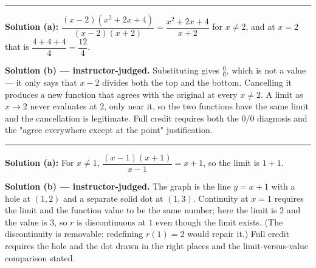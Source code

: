 \documentclass[12pt]{article}
\begin{document}
\vspace{0.15cm}\noindent\rule{\linewidth}{0.2pt}\vspace{0.15cm}


\textbf{Solution (a):} \quad
$\dfrac{(x-2)\left(x^2+2x+4\right)}{(x-2)(x+2)} = \dfrac{x^2+2x+4}{x+2}$ for $x \ne 2$, and at
$x = 2$ that is $\dfrac{4+4+4}{4} = \dfrac{12}{4}$. 

\textbf{Solution (b) --- instructor-judged.} \quad Substituting gives $\frac{0}{0}$, which is
not a value --- it only says that $x-2$ divides both the top and the bottom. Cancelling it
produces a new function that agrees with the original at every $x \ne 2$. A limit as
$x \to 2$ never evaluates at $2$, only near it, so the two functions have the same limit and
the cancellation is legitimate. Full credit requires both the $0/0$ diagnosis and the
"agree everywhere except at the point" justification.

\vspace{0.15cm}\noindent\rule{\linewidth}{0.2pt}\vspace{0.15cm}


\textbf{Solution (a):} \quad For $x \ne 1$, $\dfrac{(x-1)(x+1)}{x-1} = x+1$, so the limit is
$1 + 1$. 

\textbf{Solution (b) --- instructor-judged.} \quad The graph is the line $y = x + 1$ with a hole
at $(1,2)$ and a separate solid dot at $(1,3)$. Continuity at $x = 1$ requires the limit and the
function value to be the same number; here the limit is $2$ and the value is $3$, so $r$ is
discontinuous at $1$ even though the limit exists. (The discontinuity is removable: redefining
$r(1) = 2$ would repair it.) Full credit requires the hole and the dot drawn in the right
places and the limit-versus-value comparison stated.
\end{document}
